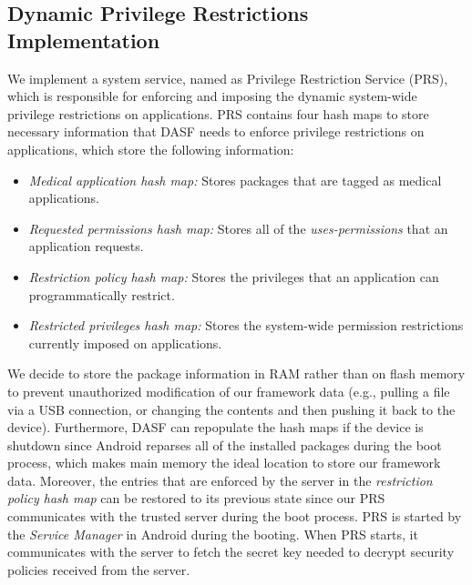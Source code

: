 \subsection{Dynamic Privilege Restrictions Implementation}

We implement a system service, named as Privilege Restriction Service (PRS),
which is responsible for enforcing and imposing the dynamic system-wide
privilege restrictions on applications.  PRS contains four hash maps to store
necessary information that DASF needs to enforce privilege restrictions on
applications, which store the following information:

\begin{itemize}
\item \textit{Medical application hash map:} Stores packages that are
 tagged as medical applications.
\item \textit{Requested permissions hash map:} Stores all of
the \textit{uses-permissions} that an application requests.
\item \textit{Restriction policy hash map:} Stores the privileges that
an application can programmatically restrict.
\item \textit{Restricted privileges hash map:} Stores the system-wide
permission restrictions currently imposed on applications.
\end{itemize}

We decide to store the package information in RAM rather than on flash memory
to prevent unauthorized modification of our framework data (e.g., pulling a
file via a USB connection, or changing the contents and then pushing it back to
the device). Furthermore, DASF can repopulate the hash maps if the device is
shutdown since Android reparses all of the installed packages during the boot
process, which makes main memory the ideal location to store our framework
data.  Moreover, the entries that are enforced by the server in the
\textit{restriction policy hash map} can be restored to its previous state
since our PRS communicates with the trusted server during the boot process.
PRS is started by the \textit{Service Manager} in Android during the booting.
When PRS starts, it communicates with the server to fetch the secret key needed
to decrypt security policies received from the server.   

